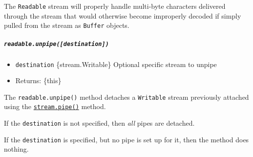 The \texttt{Readable} stream will properly handle multi-byte characters
delivered through the stream that would otherwise become improperly
decoded if simply pulled from the stream as \texttt{Buffer} objects.

\begin{Shaded}
\begin{Highlighting}[]
\OperatorTok{=} \NormalTok{()}\OperatorTok{;}
\NormalTok{(}\NormalTok{)}\OperatorTok{;}
\NormalTok{(}\OperatorTok{,}\KeywordTok{=\textgreater{}}\NormalTok{ \{}
\NormalTok{(}\OperatorTok{,} \NormalTok{)}\OperatorTok{;}
  \NormalTok{(}\OperatorTok{,}\NormalTok{)}\OperatorTok{;}
\NormalTok{\})}\OperatorTok{;}
\end{Highlighting}
\end{Shaded}

\subparagraph{\texorpdfstring{\texttt{readable.unpipe({[}destination{]})}}{readable.unpipe({[}destination{]})}}\label{readable.unpipedestination}

\begin{itemize}
\tightlist
\item
  \texttt{destination} \{stream.Writable\} Optional specific stream to
  unpipe
\item
  Returns: \{this\}
\end{itemize}

The \texttt{readable.unpipe()} method detaches a \texttt{Writable}
stream previously attached using the
\hyperref[readablepipedestination-options]{\texttt{stream.pipe()}}
method.

If the \texttt{destination} is not specified, then \emph{all} pipes are
detached.

If the \texttt{destination} is specified, but no pipe is set up for it,
then the method does nothing.

